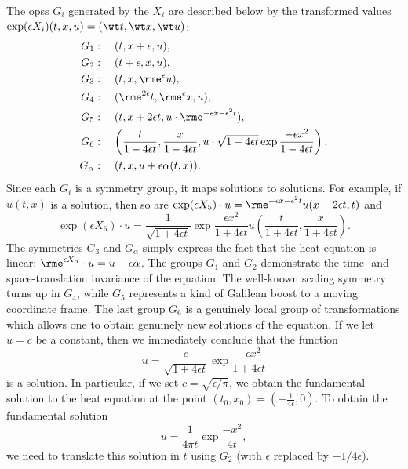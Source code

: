 \begin{example}
    The \glspl{ops} $G_i$ generated by the $X_i$ are described below by the transformed values $\exp(\epsilon X_i)(t,x,u)=(\wt t,\wt x,\wt u)$:
    \[\begin{split}
        G_1&:\quad (t,x+\epsilon,u),\\
        G_2&:\quad (t+\epsilon,x,u),\\
        G_3&:\quad (t,x,\rme^\epsilon u),\\
        G_4&:\quad (\rme^{2\epsilon}t,\rme^\epsilon x,u),\\
        G_5&:\quad (t,x+2\epsilon t,u\cdot \rme^{-\epsilon x-\epsilon^2 t}),\\
        G_6&:\quad \left(\frac{t}{1-4\epsilon t},\frac{x}{1-4\epsilon t},u\cdot \sqrt{1-4\epsilon t}\exp \frac{-\epsilon x^2}{1-4\epsilon t}\right),\\
        G_\alpha&:\quad (t,x,u+\epsilon \alpha(t,x)).\\
    \end{split}\]
    Since each $G_i$ is a symmetry group, it maps solutions to solutions. For example, if $u(t,x)$ is a solution, then so are $\exp(\epsilon X_5)\cdot u=\rme^{-\epsilon x-\epsilon^2 t}u(x-2\epsilon t,t)$ and 
    \[\exp(\epsilon X_6)\cdot u=\frac{1}{\sqrt{1+4\epsilon t}}\exp\frac{\epsilon x^2}{1+4\epsilon t}u\left(\frac{t}{1+4\epsilon t},\frac{x}{1+4\epsilon t}\right).\]
    The symmetries $G_3$ and $G_\alpha$ simply express the fact that the heat equation is linear: $\rme^{\epsilon X_\alpha}\cdot u=u+\epsilon\alpha$. The groups $G_1$ and $G_2$ demonstrate the time- and space-translation invariance of the equation. The well-known scaling symmetry turns up in $G_4$, while $G_5$ represents a kind of Galilean boost to a moving coordinate frame. The last group $G_6$ is a genuinely local group of transformations which allows one to obtain genuinely new solutions of the equation. If we let $u=c$ be a constant, then we immediately conclude that the function 
    \[u=\frac{c}{\sqrt{1+4\epsilon t}}\exp\frac{-\epsilon x^2}{1+4\epsilon t}\]
    is a solution. In particular, if we set $c=\sqrt{\epsilon/\pi}$, we obtain the fundamental solution to the heat equation at the point $(t_0,x_0)=(-\frac{1}{4\epsilon},0)$. To obtain the fundamental solution 
    \[u=\frac{1}{4\pi t}\exp\frac{-x^2}{4t},\]
    we need to translate this solution in $t$ using $G_2$ (with $\epsilon$ replaced by $-1/4\epsilon$).
\end{example}


